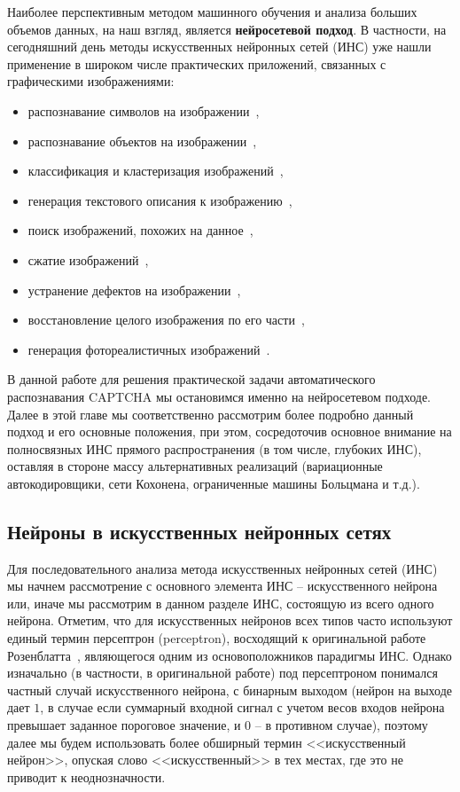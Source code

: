 \documentclass[a4paper,12pt,russian]{article} %
\begin{document}
Наиболее перспективным методом машинного обучения и анализа больших объемов данных, на наш взгляд, является \textbf{нейросетевой подход}.
В частности, на сегодняшний день методы искусственных нейронных сетей (ИНС) уже нашли применение в широком числе практических приложений, связанных с графическими изображениями: 
\begin{itemize}
	\item распознавание символов на изображении~\cite{jaderberg2014synthetic},
	\item распознавание объектов на изображении~\cite{rowley1998neural},
	\item классификация и кластеризация изображений~\cite{ciregan2012multi,simonyan2014very},
	\item генерация текстового описания к изображению~\cite{karpathy2015deep},
	\item поиск изображений, похожих на данное~\cite{wang2010semi},
	\item сжатие изображений~\cite{dony1995neural,daugman1988complete},
	\item устранение дефектов на изображении~\cite{jain2009natural}, 
	\item восстановление целого изображения по его части~\cite{yang2002image},
	\item генерация фотореалистичных изображений~\cite{gregor2015draw,ulyanov2016texture}.
\end{itemize}

В данной работе для решения практической задачи автоматического распознавания CAPTCHA мы остановимся именно на нейросетевом подходе.
Далее в этой главе мы соответственно рассмотрим более подробно данный подход и его основные положения, при этом, сосредоточив основное внимание на полносвязных ИНС прямого распространения (в том числе, глубоких ИНС), оставляя в стороне массу альтернативных реализаций (вариационные автокодировщики, сети Кохонена, ограниченные машины Больцмана и т.д.).

\newpage
\subsection{Нейроны в искусственных нейронных сетях} \label{ss:review_neuron}

Для последовательного анализа метода искусственных нейронных сетей (ИНС) мы начнем рассмотрение с основного элемента ИНС -- искусственного нейрона или, иначе мы рассмотрим в данном разделе ИНС, состоящую из всего одного нейрона.
Отметим, что для искусственных нейронов всех типов часто используют единый термин персептрон (perceptron), восходящий к оригинальной работе Розенблатта~\cite{rosenblatt1958perceptron}, являющегося одним из основоположников парадигмы ИНС.
Однако изначально (в частности, в оригинальной работе) под персептроном понимался частный случай искусственного нейрона, с бинарным выходом (нейрон на выходе дает $1$, в случае если суммарный входной сигнал с учетом весов входов нейрона превышает заданное пороговое значение, и $0$ -- в противном случае), поэтому далее мы будем использовать более обширный термин <<искусственный нейрон>>, опуская слово <<искусственный>> в тех местах, где это не приводит к неоднозначности.
\end{document}
